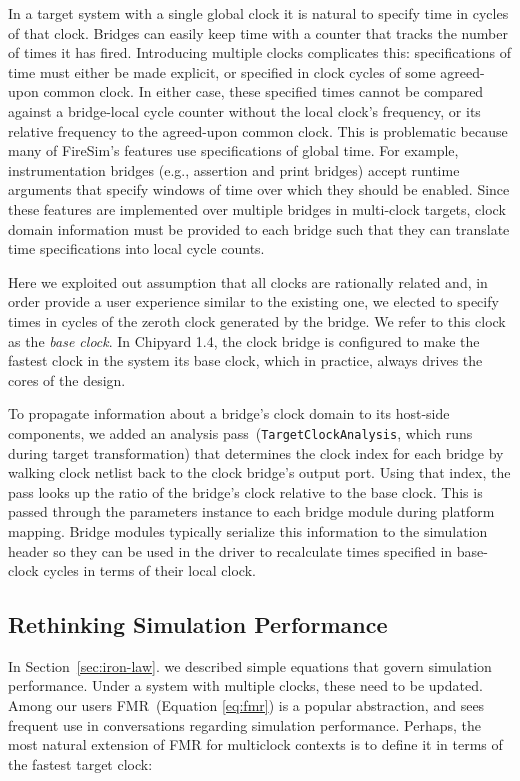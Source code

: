 In a target system with a single global clock it is natural to specify time
in cycles of that clock. Bridges can easily keep time with a counter that tracks the number of times it has fired. Introducing
multiple clocks complicates this: specifications of time must either be made
explicit, or specified in clock cycles of some agreed-upon common clock. In
either case, these specified times cannot be compared against a bridge-local
cycle counter without the local clock's frequency, or its relative frequency to
the agreed-upon common clock. This is problematic because many of FireSim's
features use specifications of global time. For example,
instrumentation bridges (e.g., assertion and print bridges) accept
runtime arguments that specify windows of time over which they should be
enabled. Since these features are implemented over multiple bridges in
multi-clock targets, clock domain information must be provided to each bridge
such that they can translate time specifications into local cycle counts.

Here we exploited out assumption that all clocks are rationally related and, in
order provide a user experience similar to the existing one, we elected to
specify times in cycles of the zeroth clock generated by the bridge. We refer
to this clock as the \emph{base clock}. In Chipyard 1.4, the clock bridge is
configured to make the fastest clock in the system its base clock, which in
practice, always drives the cores of the design.

To propagate information about a bridge's clock domain to its host-side
components, we added an analysis pass~(\texttt{TargetClockAnalysis}, which runs during target transformation)
 that determines the clock index for each bridge
by walking clock netlist back to the clock bridge's output port. Using that
index, the pass looks up the ratio of the bridge's clock relative to the base
clock. This is passed through the parameters instance to each bridge module
during platform mapping. Bridge modules typically serialize this information to the
simulation header so they can be used in the driver to recalculate times
specified in base-clock cycles in terms of their local clock.

\subsection{Rethinking Simulation Performance}\label{sec:multiclock-sim-perf}

In Section~\ref{sec:iron-law}. we described simple equations that govern
simulation performance.  Under a system with multiple clocks, these need to be
updated. Among our users FMR~(Equation \ref{eq:fmr}) is a popular abstraction, and sees frequent use
in conversations regarding simulation performance. Perhaps, the most natural
extension of FMR for multiclock contexts is to define it in terms of the fastest
target clock:

